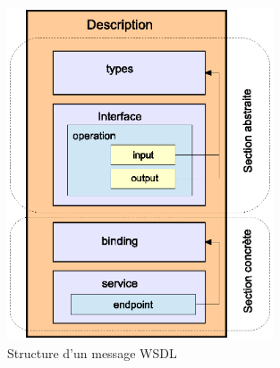 \begin{figure}[h]
    \centering
    \includegraphics[width=0.7\textwidth]{figs/wsdl-document-structure.eps}
    \caption{Structure d'un message \textsc{WSDL}}
    \label{fig:wsdl-document-structure}
\end{figure}

